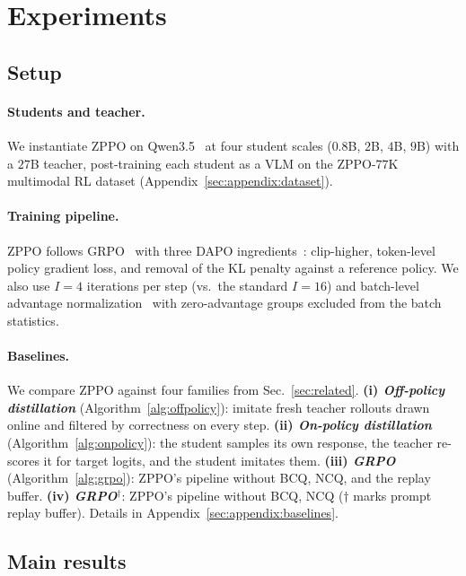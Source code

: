 \section{Experiments}
\label{sec:experiments}

\subsection{Setup}
\label{sec:experiments:setup}

\paragraph{Students and teacher.}
We instantiate ZPPO on Qwen3.5~\citep{qwen3.5} at four student scales ($0.8$B, $2$B, $4$B, $9$B) with a $27$B teacher, post-training each student as a VLM on the ZPPO-$77$K multimodal RL dataset (Appendix~\ref{sec:appendix:dataset}).

\paragraph{Training pipeline.}
ZPPO follows GRPO~\citep{shao2024deepseekmath} with three DAPO ingredients~\citep{yu2025dapo}: clip-higher, token-level policy gradient loss, and removal of the KL penalty against a reference policy. We also use $I\!=\!4$ iterations per step (vs.\ the standard $I\!=\!16$) and batch-level advantage normalization~\citep{hu2025reinforce++} with zero-advantage groups excluded from the batch statistics.



\paragraph{Baselines.}
We compare ZPPO against four families from Sec.~\ref{sec:related}.
\textbf{(i) \emph{Off-policy distillation}} (Algorithm~\ref{alg:offpolicy}): imitate fresh teacher rollouts drawn online and filtered by correctness on every step.
\textbf{(ii) \emph{On-policy distillation}} (Algorithm~\ref{alg:onpolicy}): the student samples its own response, the teacher re-scores it for target logits, and the student imitates them.
\textbf{(iii) \emph{GRPO}} (Algorithm~\ref{alg:grpo}): ZPPO's pipeline without BCQ, NCQ, and the replay buffer.
\textbf{(iv) \emph{GRPO$^{\dagger}$}}: ZPPO's pipeline without BCQ, NCQ (${\dagger}$ marks prompt replay buffer). Details in Appendix~\ref{sec:appendix:baselines}.

\subsection{Main results}
\label{sec:experiments:main}

